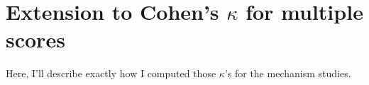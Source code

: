 \graphicspath{{appendices/kappa-extension/}}

\chapter{Extension to Cohen's \texorpdfstring{$\kappa$}{kappa} for multiple scores}

Here, I'll describe exactly how I computed those $\kappa$'s for the mechanism
studies.
